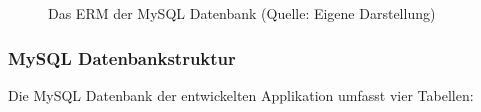 \documentclass[../main.tex]{subfiles}
\begin{document}
	\begin{figure} 
		\centering
		\caption{Das ERM der MySQL Datenbank (Quelle: Eigene Darstellung)}
		\label{ERM}
	\end{figure}
	
	\subsubsection{MySQL Datenbankstruktur} \label{MySQLStructure}
	Die MySQL Datenbank der entwickelten Applikation umfasst vier Tabellen:
	
\end{document}
